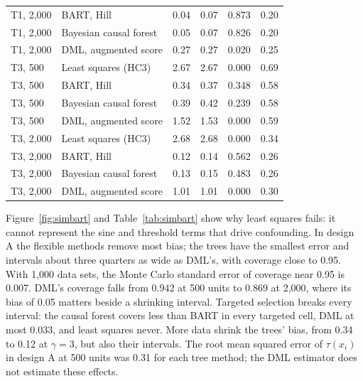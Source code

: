 \begin{table}[ht]
\begin{tabular}{llcccc}
T1, 2{,}000 & BART, Hill & 0.04 & 0.07 & 0.873 & 0.20 \\
T1, 2{,}000 & Bayesian causal forest & 0.05 & 0.07 & 0.826 & 0.20 \\
T1, 2{,}000 & DML, augmented score & 0.27 & 0.27 & 0.020 & 0.25 \\
\midrule
T3, 500 & Least squares (HC3) & 2.67 & 2.67 & 0.000 & 0.69 \\
T3, 500 & BART, Hill & 0.34 & 0.37 & 0.348 & 0.58 \\
T3, 500 & Bayesian causal forest & 0.39 & 0.42 & 0.239 & 0.58 \\
T3, 500 & DML, augmented score & 1.52 & 1.53 & 0.000 & 0.59 \\
\midrule
T3, 2{,}000 & Least squares (HC3) & 2.68 & 2.68 & 0.000 & 0.34 \\
T3, 2{,}000 & BART, Hill & 0.12 & 0.14 & 0.562 & 0.26 \\
T3, 2{,}000 & Bayesian causal forest & 0.13 & 0.15 & 0.483 & 0.26 \\
T3, 2{,}000 & DML, augmented score & 1.01 & 1.01 & 0.000 & 0.30 \\
\bottomrule
\end{tabular}
\end{table}

Figure~\ref{fig:simbart} and Table~\ref{tab:simbart} show why least squares fails: it cannot represent the sine and threshold terms that drive confounding. In design A the flexible methods remove most bias; the trees have the smallest error and intervals about three quarters as wide as DML's, with coverage close to 0.95. With 1,000 data sets, the Monte Carlo standard error of coverage near 0.95 is 0.007. DML's coverage falls from 0.942 at 500 units to 0.869 at 2,000, where its bias of 0.05 matters beside a shrinking interval. Targeted selection breaks every interval: the causal forest covers less than BART in every targeted cell, DML at most 0.033, and least squares never. More data shrink the trees' bias, from 0.34 to 0.12 at $\gamma = 3$, but also their intervals. The root mean squared error of $\tau(x_i)$ in design A at 500 units was 0.31 for each tree method; the DML estimator does not estimate these effects.

